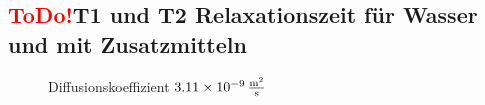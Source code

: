 \subsection{\textcolor{red}{ToDo!}T1 und T2 Relaxationszeit für Wasser und mit Zusatzmitteln}
\begin{figure}[H]
    \centering
    
    \caption{Diffusionskoeffizient $\SI{3,11e-9}{\frac{\m^2}{s}}$}
\end{figure}